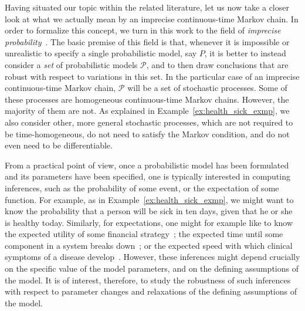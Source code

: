 \documentclass[10pt,a4paper]{paper}
\theoremstyle{definition}
\begin{document}







Having situated our topic within the related literature, let us now take a closer look at what we actually mean by an imprecise continuous-time Markov chain.
In order to formalize this concept, we turn in this work to the field of \emph{imprecise probability}~\cite{Walley:1991vk,troffaes2013:lp,augustin2013:itip}. The basic premise of this field is that, whenever it is impossible or unrealistic to specify a single probabilistic model, say $P$, it is better to instead consider a \emph{set} of probabilistic models $\mathcal{P}$, and to then draw conclusions that are robust with respect to variations in this set. In the particular case of an imprecise continuous-time Markov chain, $\mathcal{P}$ will be a set of stochastic processes. Some of these processes are homogeneous continuous-time Markov chains. However, the majority of them are not. As explained in Example~\ref{ex:health_sick_exmp}, we also consider other, more general stochastic processes, which are not required to be time-homogeneous, do not need to satisfy the Markov condition, and do not even need to be differentiable.


From a practical point of view, once a probabilistic model has been formulated and its parameters have been specified, one is typically interested in computing inferences, such as the probability of some event, or the expectation of some function. For example, as in Example~\ref{ex:health_sick_exmp}, we might want to know the probability that a person will be sick in ten days, given that he or she is healthy today.
Similarly, for expectations, one might for example like to know the expected utility of some financial strategy~\cite{sass2004optimizing}; the expected time until some component in a system breaks down~\cite{besnard2010approach}; or the expected speed with which clinical symptoms of a disease develop~\cite{duffy1995estimation}. However, these inferences might depend crucially on the specific value of the model parameters, and on the defining assumptions of the model.
It is of interest, therefore, to study the robustness of such inferences with respect to parameter changes and relaxations of the defining assumptions of the model.
\end{document}
